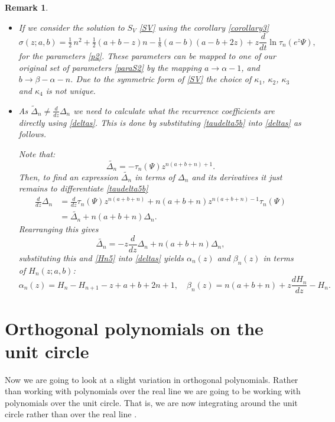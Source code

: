\documentclass[12pt]{article}
\newtheorem{mydef3}{Remark}[section]
\numberwithin{figure}{section}
\numberwithin{equation}{section}
\numberwithin{table}{section}
\begin{document}
\begin{mydef3}
{\quad \phantom{x}
\begin{itemize}
\item
If we consider the solution to $S_V$ \eqref{SV} using the corollary \eqref{corollary3}
\begin{equation}
\sigma(z; a, b) =\tfrac{1}{2}\,{n}^{2}+\tfrac{1}{2}\left(a+
 b-z \right) n-\tfrac{1}{8}\left(  a- b \right)( a- b+2z)
+z\frac{d}{dt}\ln\tau_n(e^z\Psi),\nonumber
\end{equation}
for the parameters \eqref{p2}. These parameters can be mapped to one of our original set of parameters \eqref{paraS2} by the mapping
$ a\rightarrow \alpha-1$, and $ b\rightarrow \beta- \alpha-n$. Due to the symmetric form of \eqref{SV} the choice of $\kappa_1$, $\kappa_2$, $\kappa_3$ and $\kappa_4$ is not unique.
\item
As $\widetilde\Delta_n\ne\frac{d}{dz}\Delta_n$ we need to calculate what the recurrence coefficients are directly using \eqref{deltas}. This is done by substituting \eqref{taudelta5b} into \eqref{deltas} as follows.

Note that:
\begin{equation}
\widetilde{\Delta_n}=-\tau_n(\Psi)z^{n(a+b+n)+1}.
\end{equation}
Then, to find an expression $\widetilde{\Delta_n}$ in terms of $\Delta_n$ and its derivatives it just remains to differentiate \eqref{taudelta5b}
\begin{align}
\frac{d}{dz}\Delta_n&=\frac{d}{dz}\tau_n(\Psi) z^{n(a+b+n)}+n(a+b+n)z^{n(a+b+n)-1}\tau_n(\Psi)\\
&=\widetilde{\Delta_n}+n(a+b+n)\Delta_n.
\end{align}
Rearranging this gives
$$
\widetilde{\Delta_n}=-z\frac{d}{dz}\Delta_n+n(a+b+n)\Delta_n,
$$
substituting this and \eqref{Hn5} into \eqref{deltas} yields
$\alpha_n(z)$ and $\beta_n(z)$ in terms of $H_n(z; a, b)$:
\begin{equation}\nonumber
\alpha_n(z)=H_n-H_{n+1}-z+a+b+2n+1,\quad
\beta_n(z)=n(a+b+n)+z\frac{dH_n}{dz}-H_n.
\end{equation}
\end{itemize}}
\end{mydef3}

\newpage\section{Orthogonal polynomials on the unit circle}
Now we are going to look at a slight variation in orthogonal polynomials. Rather than working with polynomials over the real line we are going to be working with polynomials over the unit circle. That is, we are now integrating around the unit circle rather than over the real line \cite[\S18.33]{DLMF}.
\end{document}

